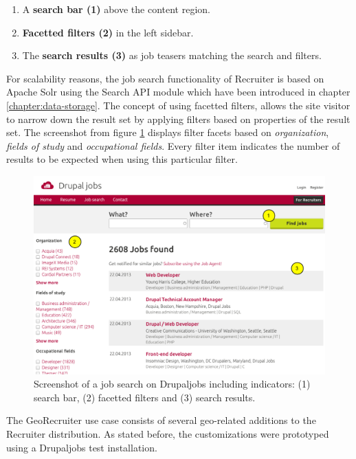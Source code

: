 \begin{enumerate}

\item A \textbf{search bar (1)} above the content region.
\item \textbf{Facetted filters (2)} in the left sidebar.
\item The \textbf{search results (3)} as job teasers matching the search and filters.

\end{enumerate}

For scalability reasons, the job search functionality of Recruiter is based on Apache Solr using the Search API module which have been introduced in chapter \ref{chapter:data-storage}. The concept of using facetted filters, allows the site visitor to narrow down the result set by applying filters based on properties of the result set. The screenshot from figure \ref{fig:recruiter-job-search} displays filter facets based on \textit{organization}, \textit{fields of study} and \textit{occupational fields}. Every filter item indicates the number of results to be expected when using this particular filter. 

\begin{figure}[h]
  \begin{center}
    \includegraphics[width=1\textwidth]{figures/recruiter_job_search.pdf}
    \caption{Screenshot of a job search on Drupaljobs including indicators: (1) search bar, (2) facetted filters and (3) search results.}
    \label{fig:recruiter-job-search}
  \end{center}
\end{figure}

The GeoRecruiter use case consists of several geo-related additions to the Recruiter distribution. As stated before, the customizations were prototyped using a Drupaljobs test installation.

